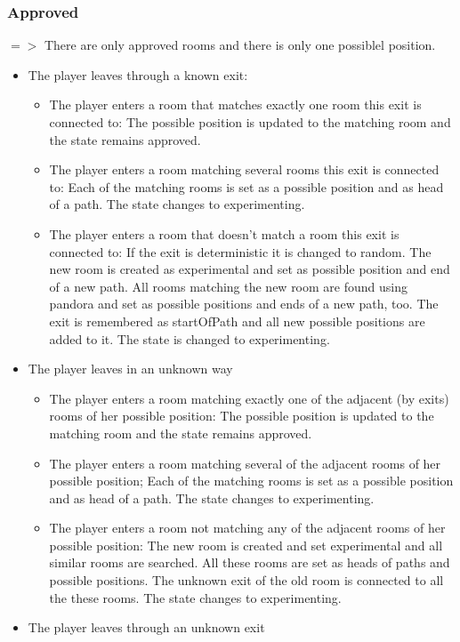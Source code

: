 \documentclass[11pt]{article}
\begin{document}
\subsubsection{Approved}
$=>$ There are only approved rooms and there is only one possiblel position.
\begin{itemize}
\item{The player leaves through a known exit:}
\begin{itemize}
\item{The player enters a room that matches exactly one room this exit is
connected to:} The possible position is updated to the matching room and the state remains
approved.
\item {The player enters a room matching several rooms this exit is connected to:}
Each of the matching rooms is set as a possible position and as head of a path. The state
changes to experimenting.
\item{The player enters a room that doesn't match a room this exit
is connected to:} If the exit is deterministic it is changed to random. The new room is created as
experimental and set as possible position and end of a new path. All rooms matching the new room are
found using pandora and set as possible positions and ends of a new path, too. The exit is remembered
as startOfPath and all new possible positions are added to it. The state is changed to
experimenting.
\end{itemize}
\item{The player leaves in an unknown way}
\begin{itemize}
\item{The player enters a room matching exactly one of the adjacent (by exits) rooms of her possible position:} The possible position is updated to
the matching room and the state remains approved.
\item{The player enters a room matching several of the adjacent rooms of her possible position;}
Each of the matching rooms is set as a possible position and as head of a path. The state
changes to experimenting.
\item{The player enters a room not matching any of the adjacent
rooms of her possible position:} The new room is created and set experimental and all similar rooms
are searched. All these rooms are set as heads of paths and possible positions. The unknown exit of
the old room is connected to all the these rooms. The state changes to experimenting.
\end{itemize}
\item{The player leaves through an unknown exit}

\end{itemize}
\end{document}
